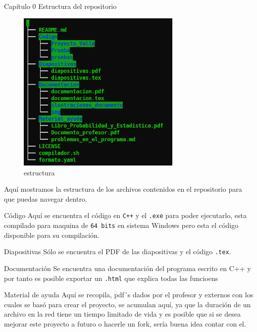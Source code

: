 \documentclass[
  spanish,
  ignorenonframetext,
]{beamer}
\begin{document}
\begin{frame}{Capítulo 0 Estructura del
repositorio}
\protect\hypertarget{capuxedtulo-0-estructura-del-repositorio}{}
\begin{figure}
\centering
\includegraphics[width=3.125in,height=\textheight]{img/README/estructura.png}
\caption{estructura}
\end{figure}

Aquí mostramos la estructura de los archivos contenidos en el
repositorio para que puedas navegar dentro.

\begin{block}{Código}
\protect\hypertarget{cuxf3digo}{}
Aquí se encuentra el código en \texttt{C++} y el \texttt{.exe} para
poder ejecutarlo, esta compilado para maquina de \texttt{64\ bits} en
sistema Windows pero esta el código disponible para su compilación.
\end{block}

\begin{block}{Diapositivas}
\protect\hypertarget{diapositivas}{}
Sólo se encuentra el PDF de las diapositivas y el código \texttt{.tex}.
\end{block}

\begin{block}{Documentación}
\protect\hypertarget{documentaciuxf3n}{}
Se encuentra una documentación del programa escrito en C++ y por tanto
es posible exportar un \texttt{.html} que explica todas las funcioens
\end{block}

\begin{block}{Material de ayuda}
\protect\hypertarget{material-de-ayuda}{}
Aquí se recopila, pdf´s dados por el profesor y externos con los cuales
se basó para crear el proyecto, se acumulan aquí, ya que la duración de
un archivo en la red tiene un tiempo limitado de vida y es posible que
si se desea mejorar este proyecto a futuro o hacerle un fork, sería
buena idea contar con el.
\end{block}


\end{frame}
\end{document}
